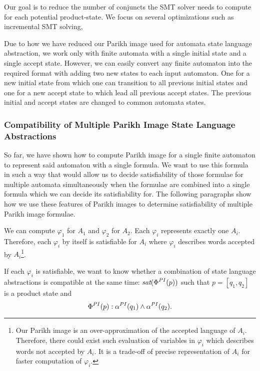Our goal is to reduce the number of conjuncts the SMT solver needs to compute for each potential product-state. We focus on several optimizations such as incremental SMT solving,

Due to how we have reduced our Parikh image used for automata state language abstraction, we work only with finite automata with a single initial state and a single accept state. However, we can easily convert any finite automaton into the required format with adding two new states to each input automaton. One for a new initial state from which one can transition to all previous initial states and one for a new accept state to which lead all previous accept states. The previous initial and accept states are changed to common automata states.


\subsubsection{Compatibility of Multiple Parikh Image State Language Abstractions}

So far, we have shown how to compute Parikh image for a single finite automaton to represent said automaton with a single formula. We want to use this formula in such a way that would allow us to decide satisfiability of those formulae for multiple automata simultaneously when the formulae are combined into a single formula which we can decide its satisfiability for. The following paragraphs show how we use these features of Parikh images to determine satisfiability of multiple Parikh image formulae.

We can compute $\varphi_1$ for $A_1$ and $\varphi_2$ for $A_2$. Each $\varphi_i$ represents exactly one $A_i$. Therefore, each $\varphi_i$ by itself is satisfiable for $A_i$ where $\varphi_i$ describes words accepted by $A_i$\footnote{Our Parikh image is an over-approximation of the accepted language of $A_i$. Therefore, there could exist such evaluation of variables in $\varphi_i$ which describes words not accepted by $A_i$. It is a trade-off of precise representation of $A_i$ for faster computation of $\varphi_i$.}.

If each $\varphi_i$ is satisfiable, we want to know whether a combination of state language abstractions is compatible at the same time: $\emph{sat}(\emph{$\Phi$}^{PI}(p))$ such that $p = [q_1, q_2]$ is a product state and
\[
    \emph{$\Phi$}^{PI}(p) : \alpha^{PI}(q_1) \wedge \alpha^{PI}(q_2) \text{.}
\]

